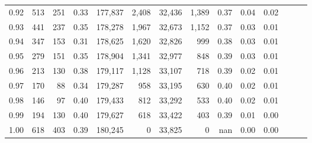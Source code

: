 \begin{tabular}{rrrrrrrrrrrrrr}
0.92 &    513 &  251 &  0.33 &  177,837 &    2,408 &  32,436 &   1,389 &  0.37 &  0.04 &      0.02 \\
0.93 &    441 &  237 &  0.35 &  178,278 &    1,967 &  32,673 &   1,152 &  0.37 &  0.03 &      0.01 \\
0.94 &    347 &  153 &  0.31 &  178,625 &    1,620 &  32,826 &     999 &  0.38 &  0.03 &      0.01 \\
0.95 &    279 &  151 &  0.35 &  178,904 &    1,341 &  32,977 &     848 &  0.39 &  0.03 &      0.01 \\
0.96 &    213 &  130 &  0.38 &  179,117 &    1,128 &  33,107 &     718 &  0.39 &  0.02 &      0.01 \\
0.97 &    170 &   88 &  0.34 &  179,287 &      958 &  33,195 &     630 &  0.40 &  0.02 &      0.01 \\
0.98 &    146 &   97 &  0.40 &  179,433 &      812 &  33,292 &     533 &  0.40 &  0.02 &      0.01 \\
0.99 &    194 &  130 &  0.40 &  179,627 &      618 &  33,422 &     403 &  0.39 &  0.01 &      0.00 \\
1.00 &    618 &  403 &  0.39 &  180,245 &        0 &  33,825 &       0 &   nan &  0.00 &      0.00 \\
\bottomrule
\end{tabular}
